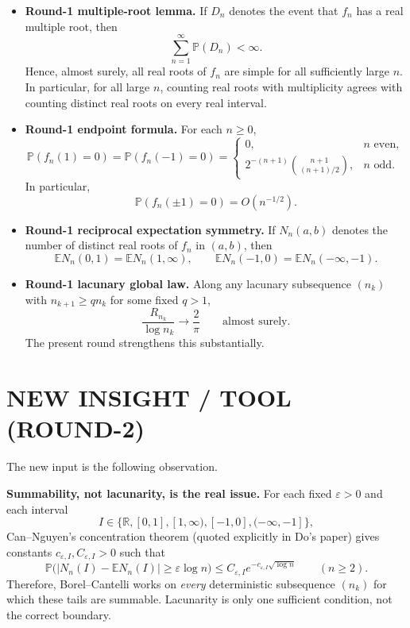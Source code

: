 \begin{itemize}
\item \textbf{Round-1 multiple-root lemma.} If $D_n$ denotes the event that $f_n$ has a real multiple root, then
\[
\sum_{n=1}^\infty \mathbb P(D_n)<\infty.
\]
Hence, almost surely, all real roots of $f_n$ are simple for all sufficiently large $n$. In particular, for all large $n$, counting real roots with multiplicity agrees with counting distinct real roots on every real interval.

\item \textbf{Round-1 endpoint formula.} For each $n\ge 0$,
\[
\mathbb P(f_n(1)=0)=\mathbb P(f_n(-1)=0)=
\begin{cases}
0,& n \text{ even},\\[3pt]
2^{-(n+1)}\binom{n+1}{(n+1)/2},& n \text{ odd}.
\end{cases}
\]
In particular,
\[
\mathbb P(f_n(\pm 1)=0)=O(n^{-1/2}).
\]

\item \textbf{Round-1 reciprocal expectation symmetry.} If $N_n(a,b)$ denotes the number of distinct real roots of $f_n$ in $(a,b)$, then
\[
\mathbb E N_n(0,1)=\mathbb E N_n(1,\infty),
\qquad
\mathbb E N_n(-1,0)=\mathbb E N_n(-\infty,-1).
\]

\item \textbf{Round-1 lacunary global law.} Along any lacunary subsequence $(n_k)$ with $n_{k+1}\ge q n_k$ for some fixed $q>1$,
\[
\frac{R_{n_k}}{\log n_k}\to \frac{2}{\pi}
\qquad\text{almost surely.}
\]
The present round strengthens this substantially.
\end{itemize}

\section{NEW INSIGHT / TOOL (ROUND-2)}

The new input is the following observation.

\medskip
\noindent\textbf{Summability, not lacunarity, is the real issue.}
For each fixed $\varepsilon>0$ and each interval
\[
I\in\{\mathbb R,[0,1],[1,\infty),[-1,0],(-\infty,-1]\},
\]
Can--Nguyen's concentration theorem (quoted explicitly in Do's paper) gives constants $c_{\varepsilon,I},C_{\varepsilon,I}>0$ such that
\[
\mathbb P\bigl(|N_n(I)-\mathbb E N_n(I)|\ge \varepsilon \log n\bigr)
\le C_{\varepsilon,I} e^{-c_{\varepsilon,I}\sqrt{\log n}}
\qquad(n\ge 2).
\]
Therefore, Borel--Cantelli works on \emph{every} deterministic subsequence $(n_k)$ for which these tails are summable. Lacunarity is only one sufficient condition, not the correct boundary.

